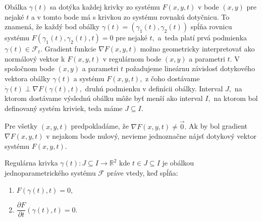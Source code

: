Obálka $\gamma(t)$ sa dotýka každej krivky zo systému $F(x,y,t)$ v bode $(x, y)$  pre nejaké $t$ a v tomto bode má s krivkou zo systému rovnakú dotyčnicu. To znamená, že každý bod obálky ${\gamma}(t) = (\gamma_{1}(t),\gamma_{2}(t))$ spĺňa rovnicu systému $F(\gamma_{1}(t),\gamma_{2}(t),t)=0$ pre nejaké $t,$ a~teda platí prvá podmienka $\gamma(t) \in \mathcal{F}_{t}$. Gradient funkcie $ \nabla F(x,y,t)$ možno geometricky interpretovať ako normálový vektor k $F(x,y,t)$ v regulárnom bode $(x,y)$ a parametri $t$. V spoločnom bode $(x,y)$ a parametri $t$ požadujeme lineárnu závislosť dotykového vektora obálky $\gamma(t)$ a systému $F(x,y,t), $ z čoho dostávame $\dot{\gamma}(t) \perp \nabla F \left( \gamma(t), t \right), $ druhú podmienku v definícii obálky. Interval $J,$ na ktorom dostávame výslednú obálku môže byť menší ako interval $I,$ na ktorom bol definovaný systém kriviek, teda máme $J \subseteq I.$

Pre všetky $(x, y, t)$ predpokladáme, že  $\nabla F(x,y,t) \neq \vec{0}. $  Ak by bol gradient $\nabla F(x,y,t) $ v nejakom bode nulový, nevieme jednoznačne nájsť dotykový vektor systému $F(x, y, t).$ 

\begin{theorem}
Regulárna krivka $\gamma(t) \colon J \subseteq I \rightarrow \mathbb{R}^{2}$ kde $t \in J  \subseteq I$ je obálkou jednoparametrického systému $\mathcal{F}$ práve vtedy, keď spĺňa:
\begin{enumerate}
\item $F(\gamma(t), t) = 0, $ 
\item $\dfrac{\partial F}{\partial t}(\gamma(t), t) = 0.$
\end{enumerate}
\end{theorem}

